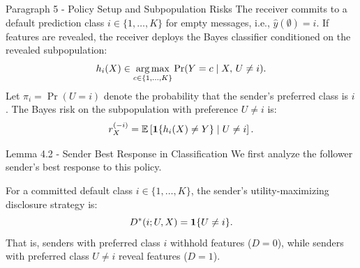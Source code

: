 \begin{faqblock}
\faqanswers
{}
\end{faqblock}

\begin{sourceblock}{Paragraph 5 - Policy Setup and Subpopulation Risks}
The receiver commits to a default prediction class $i \in \{1, \dots, K\}$ for empty messages, i.e., $\hat{y}(\emptyset) = i$. If features are revealed, the receiver deploys the Bayes classifier conditioned on the revealed subpopulation:
\begin{equation}
    \label{eq:bayes_classifier}
    h_i(X) \in \operatorname*{arg\,max}_{c \in \{1, \dots, K\}} \Pr(Y = c \mid X, \, U \ne i).
\end{equation}
Let $\pi_i = \Pr(U = i)$ denote the probability that the sender's preferred class is $i$. The Bayes risk on the subpopulation with preference $U \ne i$ is:
\begin{equation}
    \label{eq:bayes_risk_def}
    r^{(-i)}_X = \mathbb{E}\left[ \mathbf{1}\{h_i(X) \ne Y\} \;\middle|\; U \ne i \right].
\end{equation}
\end{sourceblock}

\begin{faqblock}
\faqanswers
{}
\end{faqblock}

\begin{sourceblock}{Lemma 4.2 - Sender Best Response in Classification}
We first analyze the follower sender's best response to this policy.
\begin{lemma}
\label{lem:class_best_response}
For a committed default class $i \in \{1, \dots, K\}$, the sender's utility-maximizing disclosure strategy is:
\begin{equation}
    \label{eq:class_best_response}
    D^*(i; U, X) = \mathbf{1}\{U \ne i\}.
\end{equation}
That is, senders with preferred class $i$ withhold features ($D = 0$), while senders with preferred class $U \ne i$ reveal features ($D = 1$).
\end{lemma}
\end{sourceblock}

